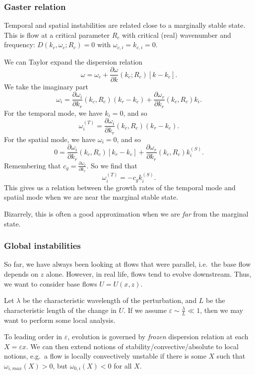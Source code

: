 \documentclass[a4paper]{article}
\begin{document}
\subsubsection*{Gaster relation}
Temporal and spatial instabilities are related close to a marginally stable state. This is flow at a critical parameter $R_c$ with critical (real) wavenumber and frequency: $D(k_c, \omega_c; R_c) = 0$ with $\omega_{c, i} = k_{c, i} = 0$.

We can Taylor expand the dispersion relation
\[
  \omega = \omega_c + \frac{\partial \omega}{\partial k} (k_c; R_c) [k - k_c].
\]
We take the imaginary part
\[
  \omega_i = \frac{\partial \omega_i}{\partial k_r} (k_c, R_c) (k_r - k_c) + \frac{\partial \omega_r}{\partial k_r}(k_c, R_c)k_i.
\]
For the temporal mode, we have $k_i = 0$, and so
\[
  \omega_i^{(T)} = \frac{\partial \omega_i}{\partial k_r}(k_c, R_c)(k_r - k_c).
\]
For the spatial mode, we have $\omega_i = 0$, and so
\[
  0 = \frac{\partial \omega_i}{\partial k_r}(k_c, R_c)[k_r - k_c] + \frac{\partial \omega_r}{\partial k_r} (k_c, R_c)k_i^{(S)}.
\]
Remembering that $c_g = \frac{\partial \omega_r}{\partial k_r}$. So we find that
\[
  \omega_i^{(T)} = - c_g k_i^{(S)}.
\]
This gives us a relation between the growth rates of the temporal mode and spatial mode when we are near the marginal stable state.

Bizarrely, this is often a good approximation when we are \emph{far} from the marginal state.

\subsubsection*{Global instabilities}
So far, we have always been looking at flows that were parallel, i.e.\ the base flow depends on $z$ alone. However, in real life, flows tend to evolve downstream. Thus, we want to consider base flows $U = U(x, z)$.

Let $\lambda$ be the characteristic wavelength of the perturbation, and $L$ be the characteristic length of the change in $U$. If we assume $\varepsilon \sim \frac{\lambda}{L} \ll 1$, then we may want to perform some local analysis.

To leading order in $\varepsilon$, evolution is governed by \emph{frozen} dispersion relation at each $X = \varepsilon x$. We can then extend notions of stability/convective/absolute to local notions, e.g.\ a flow is locally convectively unstable if there is some $X$ such that $\omega_{i, max}(X) > 0$, but $\omega_{0, i}(X) < 0$ for all $X$.
\end{document}
